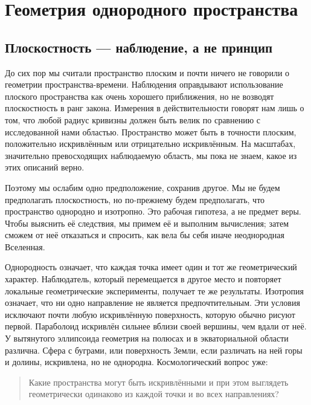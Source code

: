 \chapter{Геометрия однородного пространства}


\section{Плоскостность — наблюдение, а не принцип}

До сих пор мы считали пространство плоским и почти ничего не говорили о геометрии пространства-времени. Наблюдения оправдывают использование плоского пространства как очень хорошего приближения, но не возводят плоскостность в ранг закона. Измерения в действительности говорят нам лишь о том, что любой радиус кривизны должен быть велик по сравнению с исследованной нами областью. Пространство может быть в точности плоским, положительно искривлённым или отрицательно искривлённым. На масштабах, значительно превосходящих наблюдаемую область, мы пока не знаем, какое из этих описаний верно.

Поэтому мы ослабим одно предположение, сохранив другое. Мы не будем предполагать плоскостность, но по-прежнему будем предполагать, что пространство однородно и изотропно. Это рабочая гипотеза, а не предмет веры. Чтобы выяснить её следствия, мы примем её и выполним вычисления; затем сможем от неё отказаться и спросить, как вела бы себя иначе неоднородная Вселенная.

Однородность означает, что каждая точка имеет один и тот же геометрический характер. Наблюдатель, который перемещается в другое место и повторяет локальные геометрические эксперименты, получает те же результаты. Изотропия означает, что ни одно направление не является предпочтительным. Эти условия исключают почти любую искривлённую поверхность, которую обычно рисуют первой. Параболоид искривлён сильнее вблизи своей вершины, чем вдали от неё. У вытянутого эллипсоида геометрия на полюсах и в экваториальной области различна. Сфера с буграми, или поверхность Земли, если различать на ней горы и долины, искривлена, но не однородна. Космологический вопрос уже:
\begin{quote}
Какие пространства могут быть искривлёнными и при этом выглядеть геометрически одинаково из каждой точки и во всех направлениях?
\end{quote}

